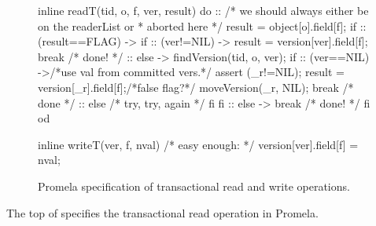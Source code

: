 \begin{figure}
\begin{inlinecode}
inline readT(tid, o, f, ver, result) {
  do
  ::
     /* we should always either be on the readerList or
      * aborted here */
     result = object[o].field[f];
     if
     :: (result==FLAG) ->
        if
        :: (ver!=NIL) ->
           result = version[ver].field[f];
           break /* done! */
        :: else ->
           findVersion(tid, o, ver);
           if
           :: (ver==NIL) ->/*use val from committed vers.*/
              assert (_r!=NIL);
              result = version[_r].field[f];/*false flag?*/
              moveVersion(_r, NIL);
              break /* done */
           :: else /* try, try, again */
           fi
        fi
     :: else -> break /* done! */
     fi
  od
}

inline writeT(ver, f, nval) {
  /* easy enough: */
  version[ver].field[f] = nval;
}
\end{inlinecode}
\caption{Promela specification of transactional read and write operations.}
\label{fig:promrwt}
\end{figure}
The top of  specifies the transactional read operation in
Promela.


